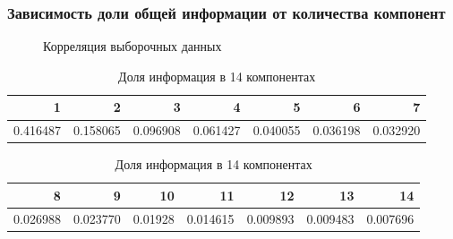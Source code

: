 \documentclass[../body.tex]{subfiles}
\begin{document}
\subsubsection{Зависимость доли общей информации от количества компонент}
\begin{figure}[H]	
	\caption{\label{corr}Корреляция выборочных данных}
\end{figure}	
	\begin{table}[H]
		\centering
		\begin{tabular}{|rrrrrrr|}
			\hline
			1 & 2        & 3        & 4        & 5        & 6        & 7  \\ \hline
			0.416487      & 0.158065 & 0.096908 & 0.061427 & 0.040055 & 0.036198 & 0.032920 \\ \hline
		\end{tabular}
		\centering
		\begin{tabular}{|rrrrrrr|}
			\hline
			8        & 9        & 10      & 11       & 12       & 13       & 14       \\ \hline
			0.026988 & 0.023770 & 0.01928 & 0.014615 & 0.009893 & 0.009483 & 0.007696 \\ \hline
		\end{tabular}
		\caption{\label{tab2}{Доля информация в 14 компонентах}}
	\end{table}
\end{document}
